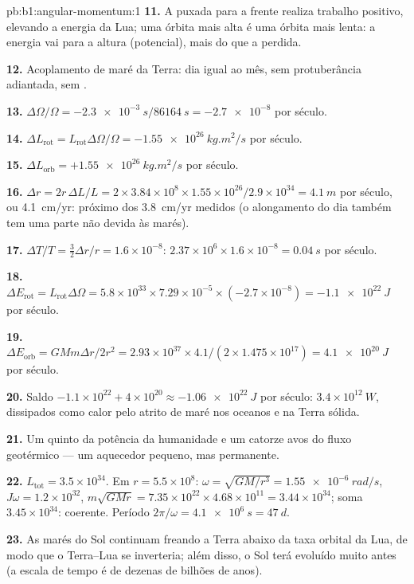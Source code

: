 \begin{solution}{pb:b1:angular-momentum:1}
\textbf{11.} A puxada para a frente realiza trabalho positivo, elevando a energia
da Lua; uma órbita mais alta é uma órbita mais lenta: a energia vai para a altura
(potencial), mais do que a  perdida.

\textbf{12.} Acoplamento de maré da Terra: dia igual ao mês, sem protuberância
adiantada, sem .

\textbf{13.} $\Delta\Omega/\Omega = -\qty{2.3e-3}{s}/\qty{86164}{s} =
\num{-2.7e-8}$ por século.

\textbf{14.} $\Delta L_{\text{rot}} = L_{\text{rot}}\Delta\Omega/\Omega =
\qty{-1.55e26}{kg.m^2/s}$ por século.

\textbf{15.} $\Delta L_{\text{orb}} = +\qty{1.55e26}{kg.m^2/s}$ por século.

\textbf{16.} $\Delta r = 2r\,\Delta L/L = 2 \times 3.84\times10^8 \times 1.55
\times10^{26}/2.9\times10^{34} = \qty{4.1}{m}$ por século, ou \qty{4.1}{cm/yr}:
próximo dos \qty{3.8}{cm/yr} medidos (o alongamento do dia também tem
uma parte não devida às marés).

\textbf{17.} $\Delta T/T = \tfrac32\Delta r/r = 1.6\times10^{-8}$: $2.37\times
10^6 \times 1.6\times10^{-8} = \qty{0.04}{s}$ por século.

\textbf{18.} $\Delta E_{\text{rot}} = L_{\text{rot}}\Delta\Omega = 5.8\times10^{33}
\times 7.29\times10^{-5} \times (-2.7\times10^{-8}) = \qty{-1.1e22}{J}$ por
século.

\textbf{19.} $\Delta E_{\text{orb}} = GMm\Delta r/2r^2 = 2.93\times10^{37}
\times 4.1/(2 \times 1.475\times10^{17}) = \qty{+4.1e20}{J}$ por século.

\textbf{20.} Saldo $-1.1\times10^{22} + 4\times10^{20} \approx \qty{-1.06e22}{J}$
por século: $3.4\times10^{12}\ \unit{W}$, dissipados como calor pelo atrito
de maré nos oceanos e na Terra sólida.

\textbf{21.} Um quinto da potência da humanidade e um catorze avos do fluxo
geotérmico --- um aquecedor pequeno, mas permanente.

\textbf{22.} $L_{\text{tot}} = 3.5\times10^{34}$. Em $r = 5.5\times10^8$:
$\omega = \sqrt{GM/r^3} = \qty{1.55e-6}{rad/s}$, $J\omega = 1.2\times10^{32}$,
$m\sqrt{GMr} = 7.35\times10^{22} \times 4.68\times10^{11} = 3.44\times10^{34}$;
soma $3.45\times10^{34}$: coerente. Período $2\pi/\omega = \qty{4.1e6}{s}
= \qty{47}{d}$.

\textbf{23.} As marés do Sol continuam freando a Terra abaixo da taxa
orbital da Lua, de modo que o  Terra--Lua se inverteria; além disso,
o Sol terá evoluído muito antes (a escala de tempo é de dezenas de
bilhões de anos).


\end{solution}
